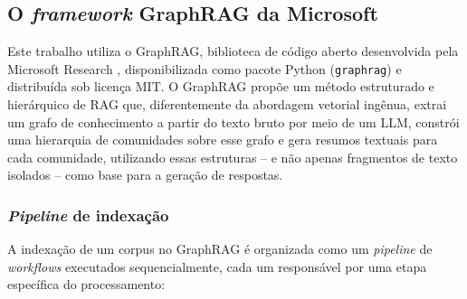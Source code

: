 \subsection{O \textit{framework} GraphRAG da Microsoft}
\label{sec-fundteo-graphrag-ms}

Este trabalho utiliza o GraphRAG, biblioteca de código aberto desenvolvida
pela Microsoft Research \cite{edge2024global}, disponibilizada como pacote Python (\texttt{graphrag}) e distribuída sob
licença MIT. O GraphRAG propõe um método estruturado e hierárquico de RAG
que, diferentemente da abordagem vetorial ingênua, extrai um grafo de
conhecimento a partir do texto bruto por meio de um LLM, constrói uma
hierarquia de comunidades sobre esse grafo e gera resumos textuais para cada
comunidade, utilizando essas estruturas -- e não apenas fragmentos de texto
isolados -- como base para a geração de respostas.

\subsubsection{\textit{Pipeline} de indexação}
\label{sec-fundteo-graphrag-indexacao}

A indexação de um corpus no GraphRAG é organizada como um \textit{pipeline}
de \textit{workflows} executados sequencialmente, cada um responsável por uma
etapa específica do processamento:

